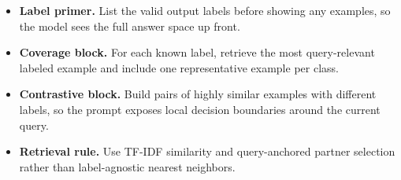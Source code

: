\begin{itemize}[leftmargin=*]
\item \textbf{Label primer.} List the valid output labels before showing any examples, so the model sees the full answer space up front.
\item \textbf{Coverage block.} For each known label, retrieve the most query-relevant labeled example and include one representative example per class.
\item \textbf{Contrastive block.} Build pairs of highly similar examples with different labels, so the prompt exposes local decision boundaries around the current query.
\item \textbf{Retrieval rule.} Use TF-IDF similarity and query-anchored partner selection rather than label-agnostic nearest neighbors.
\end{itemize}
\begin{table}[t]
\centering
{}
\caption{
    Pareto-optimal discovered variants from the main text-classification search, trading off average accuracy against context cost.
    The selected system in the main text is .
    Ctx denotes average additional characters in input context (thousands).
}
\label{tab:classification_pareto}
\end{table}

